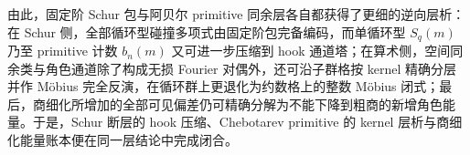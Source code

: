 \noindent
由此，固定阶 Schur 包与阿贝尔 primitive 同余层各自都获得了更细的逆向层析：在 Schur 侧，全部循环型碰撞多项式由固定阶包完备编码，而单循环型 \(S_q(m)\) 乃至 primitive 计数 \(b_n(m)\) 又可进一步压缩到 hook 通道塔；在算术侧，空间同余类与角色通道除了构成无损 Fourier 对偶外，还可沿子群格按 kernel 精确分层并作 Möbius 完全反演，在循环群上更退化为约数格上的整数 Möbius 闭式；最后，商细化所增加的全部可见偏差仍可精确分解为不能下降到粗商的新增角色能量。于是，Schur 断层的 hook 压缩、Chebotarev primitive 的 kernel 层析与商细化能量账本便在同一层结论中完成闭合。

\endinput
